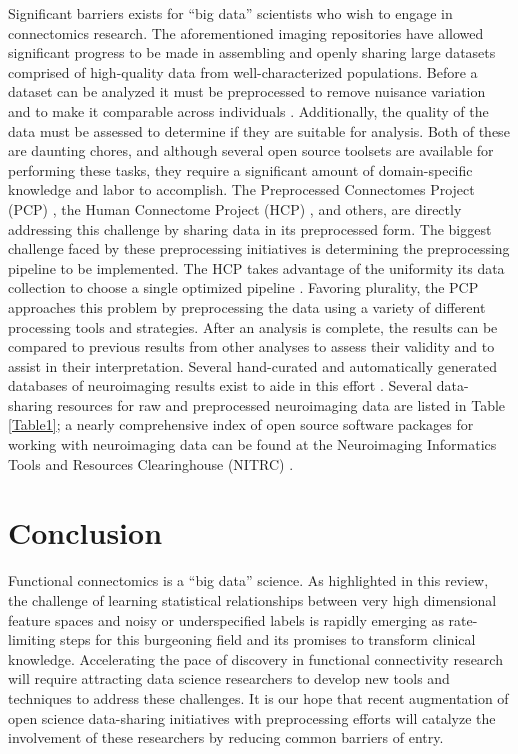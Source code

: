 \documentclass{bmcart}
\begin{document}
Significant barriers exists for ``big data'' scientists who wish to engage in connectomics research. The aforementioned imaging repositories have allowed significant progress to be made in assembling and openly sharing large datasets comprised of high-quality data from well-characterized populations. Before a dataset can be analyzed it must be preprocessed to remove nuisance variation and to make it comparable across individuals \cite{strother2006}. Additionally, the quality of the data must be assessed to determine if they are suitable for analysis. Both of these are daunting chores, and although several open source toolsets are available for performing these tasks, they require a significant amount of domain-specific knowledge and labor to accomplish. The Preprocessed Connectomes Project (PCP) \cite{CraddockPCP}, the Human Connectome Project (HCP) \cite{RosenHCP2010,VanEssen2012}, and others, are directly addressing this challenge by sharing data in its preprocessed form. The biggest challenge faced by these preprocessing initiatives is determining the preprocessing pipeline to be implemented. The HCP takes advantage of the uniformity its data collection to choose a single optimized pipeline \cite{Glasser2013}. Favoring plurality, the PCP approaches this problem by preprocessing the data using a variety of different processing tools and strategies. After an analysis is complete, the results can be compared to previous results from other analyses to assess their validity and to assist in their interpretation. Several hand-curated and automatically generated databases of neuroimaging results exist to aide in this effort \cite{Fox2002, Yarkoni2011, Neurovault, Brainspell}. Several data-sharing resources for raw and preprocessed neuroimaging data are listed in Table \ref{Table1}; a nearly comprehensive index of open source software packages for working with neuroimaging data can be found at the Neuroimaging Informatics Tools and Resources Clearinghouse (NITRC) \cite{NITRC}. 


\section {Conclusion}
Functional connectomics is a ``big data'' science. As highlighted in this review, the challenge of learning statistical relationships between very high dimensional feature spaces and noisy or underspecified labels is rapidly emerging as rate-limiting steps for this burgeoning field and its promises to transform clinical knowledge. Accelerating the pace of discovery in functional connectivity research will require attracting data science researchers to develop new tools and techniques to address these challenges. It is our hope that recent augmentation of open science data-sharing initiatives with preprocessing efforts will catalyze the involvement of these researchers by reducing common barriers of entry. 
\end{document}
